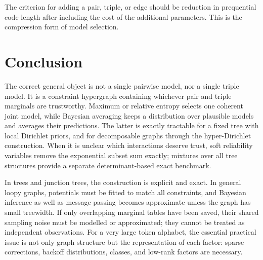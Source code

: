 \documentclass[11pt]{article}
\newcommand{\1}{\mathbf 1}
\begin{document}
\begin{keyidea}
The criterion for adding a pair, triple, or edge should be reduction in
prequential code length after including the cost of the additional parameters.
This is the compression form of model selection.
\end{keyidea}

\section{Conclusion}

The correct general object is not a single pairwise model, nor a single
triple model.  It is a constraint hypergraph containing whichever pair and
triple marginals are trustworthy.  Maximum or relative entropy selects one
coherent joint model, while Bayesian averaging keeps a distribution over
plausible models and averages their predictions.  The latter is exactly
tractable for a fixed tree with local Dirichlet priors, and for decomposable
graphs through the hyper-Dirichlet construction.  When it is unclear which
interactions deserve trust, soft reliability variables remove the exponential
subset sum exactly; mixtures over all tree structures provide a separate
determinant-based exact benchmark.

In trees and junction trees, the construction is explicit and exact.  In
general loopy graphs, potentials must be fitted to match all constraints, and
Bayesian inference as well as message passing becomes approximate unless the
graph has small treewidth.  If only overlapping marginal tables have been
saved, their shared sampling noise must be modelled or approximated; they
cannot be treated as independent observations.
For a very large token alphabet, the essential practical issue is not only
graph structure but the representation of each factor: sparse corrections,
backoff distributions, classes, and low-rank factors are necessary.
\end{document}
